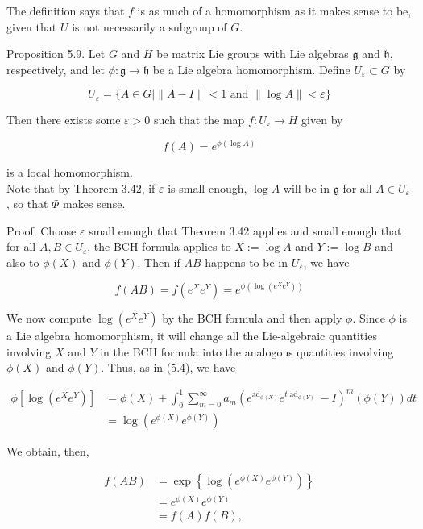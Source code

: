 \documentclass[10pt, letterpaper]{article}
\begin{document}
The definition says that $f$ is as much of a homomorphism as it makes sense to be, given that $U$ is not necessarily a subgroup of $G$.

Proposition 5.9. Let $G$ and $H$ be matrix Lie groups with Lie algebras $\mathfrak{g}$ and $\mathfrak{h}$, respectively, and let $\phi: \mathfrak{g} \rightarrow \mathfrak{h}$ be a Lie algebra homomorphism. Define $U_{\varepsilon} \subset G$ by

$$
U_{\varepsilon}=\{A \in G \mid\|A-I\|<1 \text { and }\|\log A\|<\varepsilon\}
$$

Then there exists some $\varepsilon>0$ such that the map $f: U_{\varepsilon} \rightarrow H$ given by

$$
f(A)=e^{\phi(\log A)}
$$

is a local homomorphism.\\
Note that by Theorem 3.42, if $\varepsilon$ is small enough, $\log A$ will be in $\mathfrak{g}$ for all $A \in U_{\varepsilon}$, so that $\Phi$ makes sense.

Proof. Choose $\varepsilon$ small enough that Theorem 3.42 applies and small enough that for all $A, B \in U_{\varepsilon}$, the BCH formula applies to $X:=\log A$ and $Y:=\log B$ and also to $\phi(X)$ and $\phi(Y)$. Then if $A B$ happens to be in $U_{\varepsilon}$, we have

$$
f(A B)=f\left(e^{X} e^{Y}\right)=e^{\phi\left(\log \left(e^{X} e^{Y}\right)\right)}
$$

We now compute $\log \left(e^{X} e^{Y}\right)$ by the BCH formula and then apply $\phi$. Since $\phi$ is a Lie algebra homomorphism, it will change all the Lie-algebraic quantities involving $X$ and $Y$ in the BCH formula into the analogous quantities involving $\phi(X)$ and $\phi(Y)$. Thus, as in (5.4), we have

$$
\begin{aligned}
\phi\left[\log \left(e^{X} e^{Y}\right)\right] & =\phi(X)+\int_{0}^{1} \sum_{m=0}^{\infty} a_{m}\left(e^{\operatorname{ad}_{\phi(X)}} e^{t \operatorname{ad}_{\phi(Y)}}-I\right)^{m}(\phi(Y)) d t \\
& =\log \left(e^{\phi(X)} e^{\phi(Y)}\right)
\end{aligned}
$$

We obtain, then,

$$
\begin{aligned}
f(A B) & =\exp \left\{\log \left(e^{\phi(X)} e^{\phi(Y)}\right)\right\} \\
& =e^{\phi(X)} e^{\phi(Y)} \\
& =f(A) f(B),
\end{aligned}
$$
\end{document}
